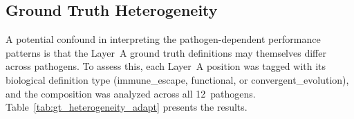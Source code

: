 \subsection{Ground Truth Heterogeneity}
\label{subsec:gt_heterogeneity_adapt}

A potential confound in interpreting the pathogen-dependent performance patterns is that the Layer~A ground truth definitions may themselves differ across pathogens.
To assess this, each Layer~A position was tagged with its biological definition type (immune\_escape, functional, or convergent\_evolution), and the composition was analyzed across all 12~pathogens.
Table~\ref{tab:gt_heterogeneity_adapt} presents the results.

\begin{table}[htbp]
\centering
\caption{Ground truth heterogeneity analysis across 12 pathogens. All pathogens are dominated by immune\_escape-tagged positions, yet the best discriminative feature differs across pathogens. ``Consistent'' indicates whether the best feature remains unchanged when restricting to immune\_escape-only positions.}
\label{tab:gt_heterogeneity_adapt}
\end{table}

